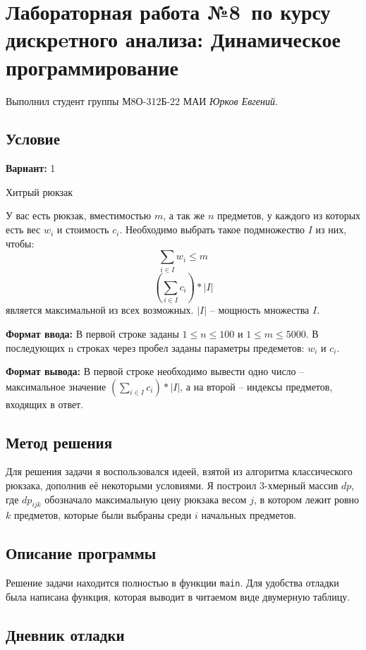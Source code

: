 \documentclass[12pt]{article}
\begin{document}
\section*{Лабораторная работа №8\, по курсу дискрeтного анализа: Динамическое программирование}

Выполнил студент группы М8О-312Б-22 МАИ \textit{Юрков Евгений}.

\subsection*{Условие}

\textbf{Вариант:} 1

Хитрый рюкзак

У вас есть рюкзак, вместимостью $m$, а так же $n$ предметов, у каждого из которых есть вес $w_i$ и стоимость $c_i$.
Необходимо выбрать такое подмножество $I$ из них, чтобы:
$$\sum_{i \in I} w_i \leq m$$
$$(\sum_{i \in I} c_i) * |I|$$
является максимальной из всех возможных.
$|I|$ – мощность множества $I$.


\textbf{Формат ввода:}
В первой строке заданы $1 \leq n \leq 100$ и $1 \leq m \leq 5000$.
В последующих n строках через пробел заданы параметры предеметов: $w_i$ и $c_i$.

\textbf{Формат вывода:}
В первой строке необходимо вывести одно число – максимальное значение $(\sum_{i \in I} c_i) * |I|$,
а на второй – индексы предметов, входящих в ответ.

\newpage
\subsection*{Метод решения}

Для решения задачи я воспользовался идеей, взятой из алгоритма классического рюкзака, дополнив её некоторыми условиями.
Я построил 3-хмерный массив $dp$, где $dp_{i j k}$ обозначало максимальную цену рюкзака весом $j$, в котором лежит ровно $k$ предметов,
которые были выбраны среди $i$ начальных предметов.

\subsection*{Описание программы}

Решение задачи находится полностью в функции \texttt{main}. Для удобства отладки была написана функция,
которая выводит в читаемом виде двумерную таблицу.

\subsection*{Дневник отладки}
\end{document}
